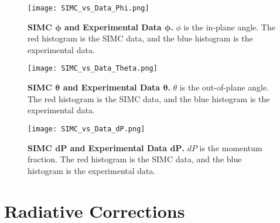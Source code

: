 \begin{figure}[!ht]
\begin{center}
\texttt{[image: SIMC\_vs\_Data\_Phi.png]}
\end{center}
\caption[SIMC $\phi$ and Experimental Data $\phi$]{
{\bf{SIMC $\boldsymbol{\phi}$ and Experimental Data $\boldsymbol{\phi}$.}} $\phi$ is the in-plane angle. The red histogram is the SIMC data, and the blue histogram is the experimental data.}
\label{fig:simc_phi}
\end{figure}

\begin{figure}[!ht]
\begin{center}
\texttt{[image: SIMC\_vs\_Data\_Theta.png]}
\end{center}
\caption[SIMC $\theta$ and Experimental Data $\theta$]{
{\bf{SIMC $\boldsymbol{\theta}$ and Experimental Data $\boldsymbol{\theta}$.}} $\theta$ is the out-of-plane angle. The red histogram is the SIMC data, and the blue histogram is the experimental data.}
\label{fig:simc_theta}
\end{figure}


\begin{figure}[!ht]
\begin{center}
\texttt{[image: SIMC\_vs\_Data\_dP.png]}
\end{center}
\caption[SIMC $dP$ and Experimental Data $dP$]{
{\bf{SIMC $\boldsymbol{dP}$ and Experimental Data $\boldsymbol{dP}$.}} $dP$ is the momentum fraction. The red histogram is the SIMC data, and the blue histogram is the experimental data.}
\label{fig:simc_dp}
\end{figure}

\section{Radiative Corrections}
\label{sec:rc}

